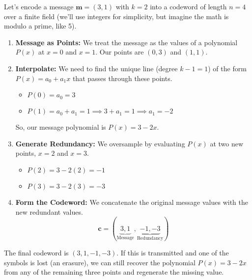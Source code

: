 \documentclass{article}
\begin{document}
\begin{tcolorbox}[title={Example: Systematic RS Encoding}]
Let's encode a message $\mathbf{m}=(3, 1)$ with $k=2$ into a codeword of length $n=4$ over a finite field (we'll use integers for simplicity, but imagine the math is modulo a prime, like 5).
\begin{enumerate}
    \item \textbf{Message as Points:} We treat the message as the values of a polynomial $P(x)$ at $x=0$ and $x=1$. Our points are $(0, 3)$ and $(1, 1)$.
    \item \textbf{Interpolate:} We need to find the unique line (degree $k-1=1$) of the form $P(x) = a_0 + a_1 x$ that passes through these points.
    \begin{itemize}
        \item $P(0) = a_0 = 3$
        \item $P(1) = a_0 + a_1 = 1 \implies 3 + a_1 = 1 \implies a_1 = -2$
    \end{itemize}
    So, our message polynomial is $P(x) = 3 - 2x$.

    \item \textbf{Generate Redundancy:} We oversample by evaluating $P(x)$ at two new points, $x=2$ and $x=3$.
    \begin{itemize}
        \item $P(2) = 3 - 2(2) = -1$
        \item $P(3) = 3 - 2(3) = -3$
    \end{itemize}
    \item \textbf{Form the Codeword:} We concatenate the original message values with the new redundant values.
    \[ \mathbf{c} = (\underbrace{3, 1}_{\text{Message}}, \underbrace{-1, -3}_{\text{Redundancy}}) \]
\end{enumerate}
The final codeword is $(3, 1, -1, -3)$. If this is transmitted and one of the symbols is lost (an erasure), we can still recover the polynomial $P(x)=3-2x$ from any of the remaining three points and regenerate the missing value.
\end{tcolorbox}
\end{document}
